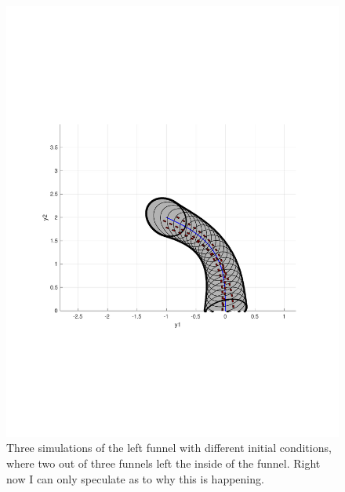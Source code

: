 \begin{figure}
  \includegraphics[scale=0.5]{figures/funnel/left_simulation}
  \caption{Three simulations of the left funnel with different initial
    conditions, where two out of three funnels left the inside of the funnel.
    Right now I can only speculate as to why this is happening.}
\end{figure} 


